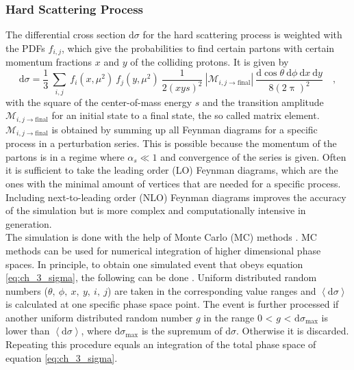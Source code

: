 \subsubsection*{Hard Scattering Process}
The differential cross section $\textrm{d}\sigma$ for the hard scattering process is weighted with the PDFs $f_{i,j}$, which give the probabilities to find certain partons with certain momentum fractions $x$ and $y$ of the colliding protons. It is given by
\begin{equation} \label{eq:ch_3_sigma}
\textrm{d}\sigma = \frac{1}{3}\ \sum_{i,j}\ f_i(x,\mu^2)\ f_j(y,\mu^2)\ \frac{1}{2(xys)^2}\ |\mathcal{M}_{i,j \rightarrow \textrm{final}}|\ \frac{\textrm{d} \cos \theta\ \textrm{d}\phi\ \textrm{d}x\ \textrm{d}y}{8(2\uppi)^2} \quad ,
\end{equation}
with the square of the center-of-mass energy $s$ and the transition amplitude $\mathcal{M}_{i,j \rightarrow \textrm{final}}$ for an initial state to a final state, the so called matrix element. $\mathcal{M}_{i,j \rightarrow \textrm{final}}$ is obtained by summing up all Feynman diagrams for a specific process in a perturbation series. This is possible because the momentum of the partons is in a regime where $\alpha_s \ll 1$ and convergence of the series is given. Often it is sufficient to take the leading order (LO) Feynman diagrams, which are the ones with the minimal amount of vertices that are needed for a specific process. Including next-to-leading order (NLO) Feynman diagrams improves the accuracy of the simulation but is more complex and computationally intensive in generation.\\

The simulation is done with the help of Monte Carlo (MC) methods \cite{MCmethod}. MC methods can be used for numerical integration of higher dimensional phase spaces. In principle, to obtain one simulated event that obeys equation \ref{eq:ch_3_sigma}, the following can be done \cite[p. 48]{PPscattering}. Uniform distributed random numbers ($\theta,\ \phi,\ x,\ y,\ i,\ j$) are taken in the corresponding value ranges and $\left<\mathrm{d}\sigma\right>$ is calculated at one specific phase space point. The event is further processed if another uniform distributed random number $g$ in the range 0 < $g$ < $\mathrm{d}\sigma_\textrm{max}$ is lower than $\left<\mathrm{d}\sigma\right>$, where $\mathrm{d}\sigma_\textrm{max}$ is the supremum of $\mathrm{d}\sigma$. Otherwise it is discarded. Repeating this procedure equals an integration of the total phase space of equation \ref{eq:ch_3_sigma}.\\


